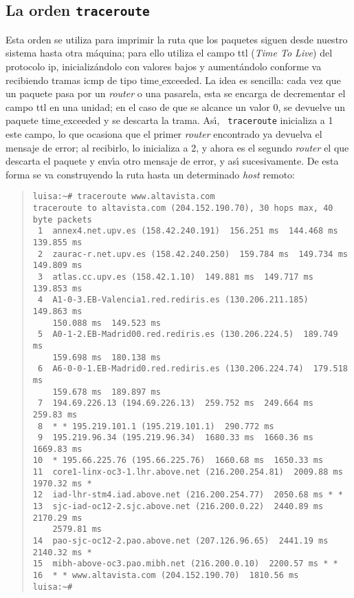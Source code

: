 \subsection{La orden {\tt traceroute}}
Esta orden se utiliza para imprimir la ruta que los paquetes siguen desde
nuestro sistema hasta otra m\'aquina; para ello utiliza el campo {\sc ttl}
({\it Time To Live}) del protocolo {\sc ip}, inicializ\'andolo con valores 
bajos y aument\'andolo conforme va recibiendo tramas {\sc icmp} de tipo
{\sc time$\_$exceeded}. La idea es sencilla: cada vez que un paquete pasa por
un {\it router} o una pasarela, esta se encarga de decrementar el campo {\sc
ttl} en una unidad; en el caso de que se alcance un valor 0, se devuelve un
paquete {\sc time$\_$exceeded} y se descarta la trama. As\'{\i}, {\tt 
traceroute} inicializa a 1 este campo, lo que ocasiona que el primer {\it 
router} encontrado ya devuelva el mensaje de error; al recibirlo, lo inicializa
a 2, y ahora es el segundo {\it router} el que descarta el paquete y env\'{\i}a
otro mensaje de error, y as\'{\i} sucesivamente. De esta forma se va 
construyendo la ruta hasta un determinado {\it host} remoto:
\begin{quote}
\begin{verbatim}
luisa:~# traceroute www.altavista.com
traceroute to altavista.com (204.152.190.70), 30 hops max, 40 byte packets
 1  annex4.net.upv.es (158.42.240.191)  156.251 ms  144.468 ms  139.855 ms
 2  zaurac-r.net.upv.es (158.42.240.250)  159.784 ms  149.734 ms  149.809 ms
 3  atlas.cc.upv.es (158.42.1.10)  149.881 ms  149.717 ms  139.853 ms
 4  A1-0-3.EB-Valencia1.red.rediris.es (130.206.211.185)  149.863 ms  
    150.088 ms  149.523 ms
 5  A0-1-2.EB-Madrid00.red.rediris.es (130.206.224.5)  189.749 ms  
    159.698 ms  180.138 ms
 6  A6-0-0-1.EB-Madrid0.red.rediris.es (130.206.224.74)  179.518 ms  
    159.678 ms  189.897 ms
 7  194.69.226.13 (194.69.226.13)  259.752 ms  249.664 ms  259.83 ms
 8  * * 195.219.101.1 (195.219.101.1)  290.772 ms
 9  195.219.96.34 (195.219.96.34)  1680.33 ms  1660.36 ms  1669.83 ms
10  * 195.66.225.76 (195.66.225.76)  1660.68 ms  1650.33 ms
11  core1-linx-oc3-1.lhr.above.net (216.200.254.81)  2009.88 ms  1970.32 ms *
12  iad-lhr-stm4.iad.above.net (216.200.254.77)  2050.68 ms * *
13  sjc-iad-oc12-2.sjc.above.net (216.200.0.22)  2440.89 ms  2170.29 ms  
    2579.81 ms
14  pao-sjc-oc12-2.pao.above.net (207.126.96.65)  2441.19 ms  2140.32 ms *
15  mibh-above-oc3.pao.mibh.net (216.200.0.10)  2200.57 ms * *
16  * * www.altavista.com (204.152.190.70)  1810.56 ms
luisa:~#
\end{verbatim}
\end{quote}
